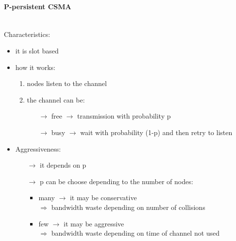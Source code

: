 \paragraph{P-persistent CSMA}\mbox{}\\[0.2cm]
Characteristics:
\begin{itemize}
    \item it is slot based
    \item how it works:
    \begin{enumerate}
        \item nodes listen to the channel
        \item the channel can be:
        \begin{itemize}
            \item[$\rightarrow$] free $\rightarrow$ transmission with probability p
            \item[$\rightarrow$] busy $\rightarrow$ wait with probability (1-p) and then retry to listen
        \end{itemize}
    \end{enumerate}
    \item Aggressiveness:
    \begin{itemize}
        \item[$\rightarrow$] it depends on p
        \item[$\rightarrow$] p can be choose depending to the number of nodes:
        \begin{itemize}
            \item many $\rightarrow$ it may be conservative\\
            $\Rightarrow$ bandwidth waste depending on number of collisions
            \item few $\rightarrow$ it may be aggressive\\
            $\Rightarrow$ bandwidth waste depending on time of channel not used
        \end{itemize}
    \end{itemize}
\end{itemize}

